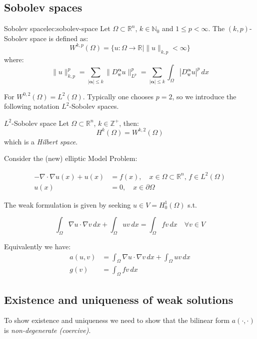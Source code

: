 \subsection{Sobolev spaces}
\begin{definition}{Sobolev space}{lec:sobolev-space}
    Let $\Omega \subset \mathbb{R}^n$, $k \in \mathbb{N}_0$ and $1 \leq p < \infty$. The $(k, p)$-Sobolev space is defined as:
    \[
        W^{k, p}(\Omega) = \{u: \Omega \to \mathbb{R} \mid \|u\|_{k,p} < \infty\}
    \]
    where:
    \[
        \|u\|_{k,p}^p  = \sum_{|\symbf{\alpha}| \leq k} \|D_{\mathrm{w}}^{\symbf{\alpha}} u\|_{L^p}^p = \sum_{|\symbf{\alpha}| \leq k} \int_\Omega |D_{\mathrm{w}}^{\symbf{\alpha}} u|^p \, dx
    \]
\end{definition}

For $W^{0, 2}(\Omega) = L^2(\Omega)$. Typically one chooses $p = 2$, so we introduce the following notation $L^2$-Sobolev spaces.
\begin{definition}{$L^2$-Sobolev space}{}
    Let $\Omega \subset \mathbb{R}^n$, $k \in \mathbb{Z}^+$, then:
    \[
        H^k(\Omega) = W^{k, 2}(\Omega)
    \]
    which is a \emph{Hilbert space}.
\end{definition}

Consider the (new) elliptic Model Problem:

\begin{align*}
    -\nabla \cdot \nabla u(x) + u(x) & = f(x), \quad x \in \Omega \subset \mathbb{R}^n, \, f \in L^2(\Omega) \\
    u(x)                             & = 0, \quad x \in \partial \Omega
\end{align*}

The weak formulation is given by seeking $u \in V = H_0^1(\Omega)$ s.t.

\[
    \int_\Omega \nabla u \cdot \nabla v \, dx + \int_\Omega u v \, dx = \int_\Omega f v \, dx \quad \forall v \in V
\]

Equivalently we have:
\begin{align*}
    a(u, v) & = \int_\Omega \nabla u \cdot \nabla v \, dx + \int_\Omega u v \, dx \\
    g(v)    & = \int_\Omega f v \, dx
\end{align*}

\subsection{Existence and uniqueness of weak solutions}
To show existence and uniqueness we need to show that the bilinear form $a(\cdot, \cdot)$ is \emph{non-degenerate (coercive)}.


